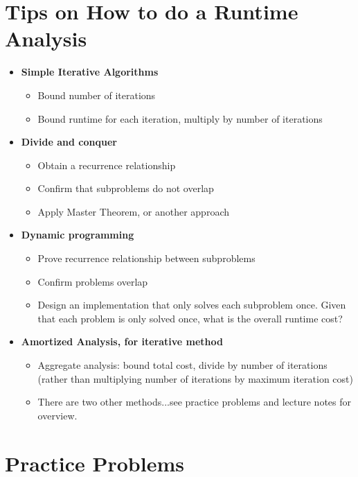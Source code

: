 \documentclass[11  pt]{exam}
\begin{document}
	
	\section{Tips on How to do a Runtime Analysis}
	
	\begin{itemize}
		\item \textbf{Simple Iterative Algorithms}
		\begin{itemize} 
			\item Bound number of iterations
			\item Bound runtime for each iteration, multiply by number of iterations
		\end{itemize}
		\item \textbf{Divide and conquer}
		\begin{itemize} 
			\item Obtain a recurrence relationship
			\item Confirm that subproblems do not overlap
			\item Apply Master Theorem, or another approach
		\end{itemize}
		\item \textbf{Dynamic programming}
		\begin{itemize} 
			\item Prove recurrence relationship between subproblems
			\item Confirm problems overlap
			\item Design an implementation that only solves each subproblem once. Given that each problem is only solved once, what is the overall runtime cost?
		\end{itemize}
		\item \textbf{Amortized Analysis, for iterative method}
		\begin{itemize} 
			\item Aggregate analysis: bound total cost, divide by number of iterations (rather than multiplying number of iterations by maximum iteration cost)
			\item There are two other methods...see practice problems and lecture notes for overview.
		\end{itemize}
	\end{itemize}
	\newpage
	
	\section{Practice Problems}
	
\end{document}
